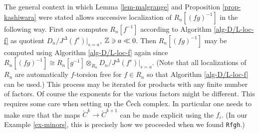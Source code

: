 The general context in which Lemma \ref{lem-malgrange} and Proposition
\ref{prop-kashiwara} were stated allows successive localization of
$R_n[(fg)^{-1}]$ 
in the following way. First one computes $R_n[f^{-1}]$ according to
Algorithm \ref{alg-D/L-loc-f} as quotient $D_n/J^\Delta(f^s)|_{s=a}$,
${\mathbb Z}\ni a\ll 0$.  
Then $R_n[(fg)^{-1}]$ may be
computed using  Algorithm 
\ref{alg-D/L-loc-f} again since $R_n[(fg)^{-1}]\cong
R_n[g^{-1}]\otimes_{R_n} 
D_n/J^\Delta(f^s)|_{s=a}$. (Note that all
localizations of $R_n$ are automatically $f$-torsion free for $f\in R_n$
so that Algorithm \ref{alg-D/L-loc-f} can be used.) This process
may be iterated for products with any finite number of factors. 
Of course the exponents for the various factors might be different. 
This requires some care 
%
%
%
%
when setting up the \v Cech complex. In particular one needs to make 
sure that the maps
$\check C^k\to \check C^{k+1}$ can be made explicit using the $f_i$.
(In our Example \ref{ex-minors}, this is precisely how we proceeded
when we found {\tt Rfgh}.)
